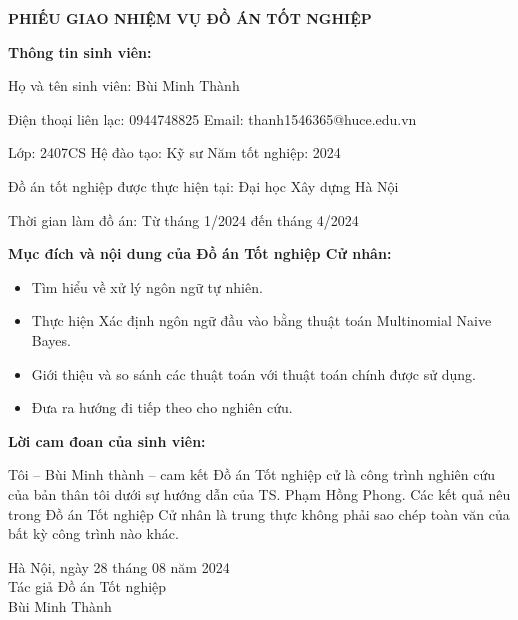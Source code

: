 \begin{center}
    \textbf{\large PHIẾU GIAO NHIỆM VỤ ĐỒ ÁN TỐT NGHIỆP}
\end{center}

\vspace{1cm}

\noindent\textbf{Thông tin sinh viên:}

Họ và tên sinh viên: Bùi Minh Thành

Điện thoại liên lạc: 0944748825 \hspace{1cm} Email: thanh1546365@huce.edu.vn

Lớp: 2407CS \hspace{2cm} Hệ đào tạo: Kỹ sư \hspace{2cm} Năm tốt nghiệp: 2024

Đồ án tốt nghiệp được thực hiện tại: Đại học Xây dựng Hà Nội

Thời gian làm đồ án: Từ tháng 1/2024 đến tháng 4/2024

\vspace{0.5cm}

\noindent\textbf{Mục đích và nội dung của Đồ án Tốt nghiệp Cử nhân:}

\begin{itemize}
    \item Tìm hiểu về xử lý ngôn ngữ tự nhiên.
    \item Thực hiện Xác định ngôn ngữ đầu vào bằng thuật toán Multinomial Naive Bayes.
    \item Giới thiệu và so sánh các thuật toán với thuật toán chính được sử dụng.
    \item Đưa ra hướng đi tiếp theo cho nghiên cứu.
\end{itemize}

\vspace{0.5cm}

\noindent\textbf{Lời cam đoan của sinh viên:}

Tôi – Bùi Minh thành – cam kết Đồ án Tốt nghiệp cử  là công trình nghiên cứu của bản thân tôi dưới sự hướng dẫn của TS. Phạm Hồng Phong. Các kết quả nêu trong Đồ án Tốt nghiệp Cử nhân là trung thực không phải sao chép toàn văn của bất kỳ công trình nào khác.

\vspace{1cm}

\begin{flushright}
    Hà Nội, ngày 28 tháng 08 năm 2024\\
    Tác giả Đồ án Tốt nghiệp \hspace{0,9cm}\text{ }\\
    \vspace{2cm}
    Bùi Minh Thành\hspace{1.7cm}\text{ }\\
\end{flushright}
\newpage

